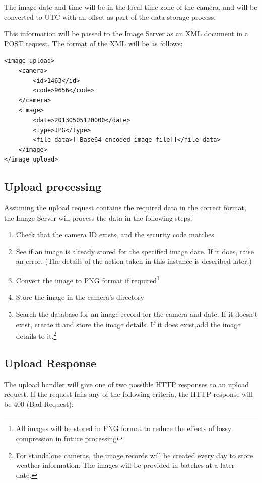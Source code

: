 \documentclass[11pt]{article}
\begin{document}
The image date and time will be in the local time zone of the camera, and will be converted to UTC with an offset as part of the data storage process.

This information will be passed to the Image Server as an XML document in a POST request. The format of the XML will be as follows:

\begin{verbatim}
<image_upload>
    <camera>
        <id>1463</id>
        <code>9656</code>
    </camera>
    <image>
        <date>20130505120000</date>
        <type>JPG</type>
        <file_data>[[Base64-encoded image file]]</file_data>
    </image>
</image_upload>
\end{verbatim}


\subsection{Upload processing}
Assuming the upload request contains the required data in the correct format, the Image Server will process the data in the following steps:

\begin{enumerate}
\item Check that the camera ID exists, and the security code matches
\item See if an image is already stored for the specified image date. If it does, raise an error. (The details of the action taken in this instance is described later.)
\item Convert the image to PNG format if required\footnote{All images will be stored in PNG format to reduce the effects of lossy compression in future processing}
\item Store the image in the camera's directory
\item Search the database for an image record for the camera and date. If it doesn't exist, create it and store the image details. If it does exist,add the image details to it.\footnote{For standalone cameras, the image records will be created every day to store weather information. The images will be provided in batches at a later date.}
\end{enumerate}

\subsection{Upload Response}
The upload handler will give one of two possible HTTP responses to an upload request. If the request fails any of the following criteria, the HTTP response will be 400 (Bad Request):
\end{document}
